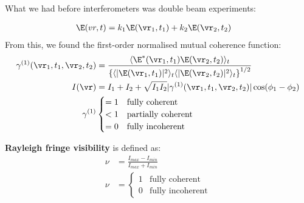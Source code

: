 \documentclass[a4paper, 11pt, normalem]{report}
\begin{document}
What we had before interferometers was double beam experiments:
\begin{figure}[H]
    \centering
    \vspace{-1.5cm}
\end{figure}
\begin{align}
    \E(vr,t) &= k_1\E(\vr_1,t_1) + k_2\E(\vr_2,t_2)
\end{align}
From this, we found the first-order normalised mutual coherence function:
\begin{align}
    \gamma^{(1)}(\vr_1,t_1,\vr_2,t_2) &= \frac{\langle\E^*(\vr_1,t_1)\E(\vr_2,t_2)\rangle_t}{\left\{\langle|\E(\vr_1,t_1)|^2\rangle_t \langle|\E(\vr_2,t_2)|^2\rangle_t\right\}^{1/2}} \\
    I(\vr) &= I_1 + I_2 + \sqrt{I_1I_2}|\gamma^{(1)}(\vr_1,t_1,\vr_2,t_2)|\cos(\phi_1-\phi_2) \\
    \gamma^{(1)} & \begin{cases} = 1 & \text{fully coherent} \\ < 1 & \text{partially coherent} \\ = 0 & \text{fully incoherent}\end{cases}
\end{align}
\begin{figure}[H]
    \centering
\end{figure}
\textbf{Rayleigh fringe visibility} is defined as:
\begin{align}
    \nu &= \frac{I_{max}-I_{min}}{I_{max}+I_{min}} \\
    \nu &= \begin{cases} 1 & \text{fully coherent} \\ 0 & \text{fully incoherent}\end{cases}
\end{align}
\end{document}
